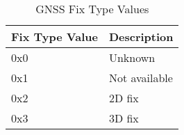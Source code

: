 \begin{table}[H]
    \centering
    \begin{tabular}{@{}ll@{}}
        \toprule
        Fix Type Value & Description   \\
        \midrule
        0x0            & Unknown       \\
        0x1            & Not available \\
        0x2            & 2D fix        \\
        0x3            & 3D fix        \\
        \bottomrule
    \end{tabular}
    \caption{GNSS Fix Type Values}
    \label{table:gnss-fix-type}
\end{table}
